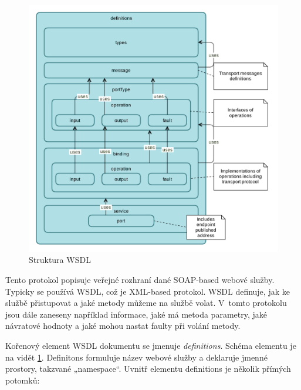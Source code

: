 \documentclass[11pt,twoside,a4paper]{book}
\begin{document}
\begin{figure}[h]
\begin{center}
\includegraphics[width=12cm]{images-pdf/wsdl.pdf} 
\caption{Struktura WSDL}
\label{fig:struktura-wsdl}
\end{center}
\end{figure}

Tento protokol popisuje veřejné rozhraní dané SOAP-based webové služby. Typicky
se používá WSDL, což je XML-based protokol. WSDL definuje, jak ke službě
přistupovat a jaké metody můžeme na službě volat. V~tomto protokolu jsou dále
zaneseny například informace, jaké má metoda parametry, jaké návratové hodnoty a
jaké mohou nastat faulty při volání metody.

Kořenový element WSDL dokumentu se jmenuje \textit{definitions}. Schéma elementu
je na vidět \ref{fig:struktura-wsdl}.
Definitons formuluje název webové služby a deklaruje jmenné prostory, takzvané
„namespace“. Uvnitř elementu definitions je několik přímých potomků:
\end{document}
